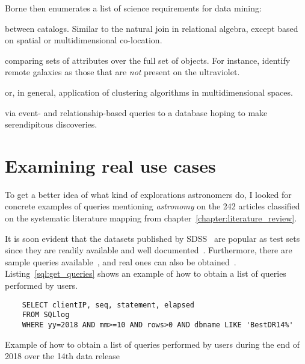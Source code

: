 Borne then enumerates a list of science requirements for data mining:

\begin{description}[leftmargin=1cm, labelindent=0.5cm]
    \item[Object Cross-Identification] between catalogs. Similar to the natural join
        in relational algebra, except based on spatial or multidimensional co-location.
    \item[Object Cross-Correlation] comparing sets of attributes over the full set of objects.
        For instance, identify remote galaxies as those that are \emph{not} present on the ultraviolet.
    \item[Nearest-neighbor identification] or, in general, application of clustering algorithms in multidimensional spaces.
    \item[Systematic Data Exploration] via event- and relationship-based queries to a database
        hoping to make serendipitous discoveries.
\end{description}

\section{Examining real use cases}

To get a better idea of what kind of explorations astronomers do, I looked for
concrete examples of queries mentioning \emph{astronomy} on the 242 articles classified on
the systematic literature mapping from chapter~\ref{chapter:literature_review}.

It is soon evident that the datasets published by \gls{SDSS}~\cite{SDSS14} are popular as test
sets since they are readily available and well documented~\cite{Gray2002}.
Furthermore, there are sample queries available~\cite{SDSSSamples}, and real ones can also be
obtained~\cite{SDSSSqlLogs}. Listing~\ref{sql:get_queries} shows an example of how to obtain a list
of queries performed by users.

\begin{listing}[htbp]
\begin{verbatim}
    SELECT clientIP, seq, statement, elapsed
    FROM SQLlog
    WHERE yy=2018 AND mm>=10 AND rows>0 AND dbname LIKE 'BestDR14%'
\end{verbatim}
\caption[Obtaining a list of queries performed by \gls{SDSS} users]{
    Example of how to obtain a list of queries performed by users during the end of 2018 over the 14th data release
}\label{sql:get_queries}
\end{listing}

